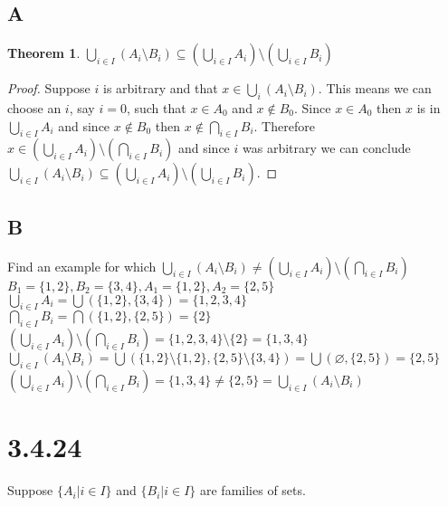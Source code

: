 \documentclass{article}
\newtheorem*{theorem}{Theorem}  %
\begin{document}
\subsection*{A}
\begin{theorem} $\bigcup_{i \in I} ( A_{i} \setminus B_{i} ) \subseteq ( \bigcup_{i \in I} A_{i} ) \setminus (\bigcup_{i \in I} B_{i})$
\end{theorem}
\begin{proof}
Suppose $i$ is arbitrary and that $x \in \bigcup_{i} (A_{i} \setminus B_{i})$. This means we can choose an $i$, say $i = 0$, such that $x \in A_{0}$ and $x \notin B_{0}$. Since $x \in A_{0}$ then $x$ is in $\bigcup_{i \in I} A_{i}$ and since $x \notin B_{0}$ then $x \notin \bigcap_{i \in I} B_{i}$. Therefore $x \in (\bigcup_{i \in I} A_{i}) \setminus (\bigcap_{i \in I} B_{i})$ and since $i$ was arbitrary we can conclude $\bigcup_{i \in I} ( A_{i} \setminus B_{i} ) \subseteq ( \bigcup_{i \in I} A_{i} ) \setminus (\bigcup_{i \in I} B_{i})$.
\end{proof}

\subsection*{B}
Find an example for which $\bigcup_{i \in I} (A_{i} \setminus B_{i} ) \neq (\bigcup_{i \in I} A_{i} ) \setminus (\bigcap_{i \in I} B_{i})$ \\

$B_{1} = \{1,2\}, B_{2} = \{3,4\}, A_{1} = \{1,2\}, A_{2} = \{2,5\}$ \\

$\bigcup_{i \in I} A_{i} = \bigcup(\{1,2\}, \{3,4\}) = \{1,2,3,4\}$ \\

$\bigcap_{i \in I} B_{i} = \bigcap(\{1,2\}, \{2,5\}) = \{2\}$ \\

$(\bigcup_{i \in I} A_{i}) \setminus (\bigcap_{i \in I} B_{i} ) = \{1,2,3,4\} \setminus \{2\} = \{1,3,4\}$ \\

$\bigcup_{i \in I} (A_{i} \setminus B_{i}) = \bigcup(\{1,2\} \setminus \{1,2\}, \{2,5\} \setminus \{3,4\}) = \bigcup ( \varnothing, \{2,5\}) = \{2, 5 \}$ \\

$(\bigcup_{i \in I} A_{i}) \setminus (\bigcap_{i \in I} B_{i} ) = \{1,3,4\} \neq \{2,5\} = \bigcup_{i \in I} (A_{i} \setminus B_{i})$


\section*{3.4.24}
Suppose $\{A_{i} | i \in I\}$ and $\{B_{i} | i \in I \}$ are families of sets.
\end{document}
